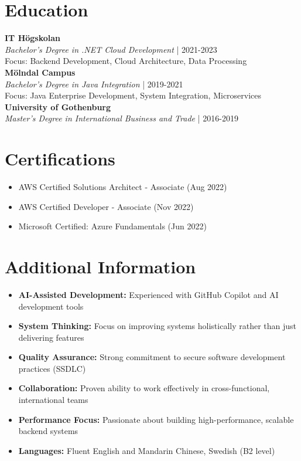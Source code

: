 \documentclass[11pt,a4paper]{article}
\begin{document}
\vspace{6pt}
\section*{Education}
\textbf{IT Högskolan}\\
\textit{Bachelor's Degree in .NET Cloud Development} | 2021-2023\\
Focus: Backend Development, Cloud Architecture, Data Processing\\
\textbf{Mölndal Campus}\\
\textit{Bachelor's Degree in Java Integration} | 2019-2021\\
Focus: Java Enterprise Development, System Integration, Microservices\\
\textbf{University of Gothenburg}\\
\textit{Master's Degree in International Business and Trade} | 2016-2019\\

\vspace{6pt}
\section*{Certifications}
\begin{itemize}[noitemsep]
\item AWS Certified Solutions Architect - Associate (Aug 2022)
\item AWS Certified Developer - Associate (Nov 2022)
\item Microsoft Certified: Azure Fundamentals (Jun 2022)
\end{itemize}

\vspace{6pt}
\section*{Additional Information}
\begin{itemize}[noitemsep]
\item \textbf{AI-Assisted Development:} Experienced with GitHub Copilot and AI development tools
\item \textbf{System Thinking:} Focus on improving systems holistically rather than just delivering features
\item \textbf{Quality Assurance:} Strong commitment to secure software development practices (SSDLC)
\item \textbf{Collaboration:} Proven ability to work effectively in cross-functional, international teams
\item \textbf{Performance Focus:} Passionate about building high-performance, scalable backend systems
\item \textbf{Languages:} Fluent English and Mandarin Chinese, Swedish (B2 level)
\end{itemize}
\end{document}
